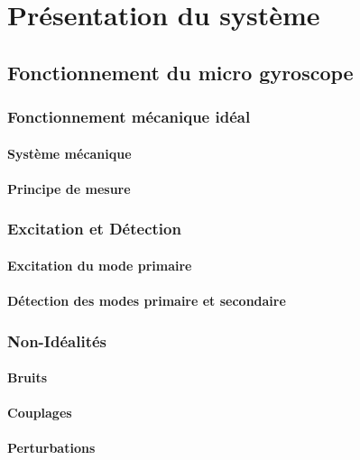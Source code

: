 \cleardoublepage{}
\chapter{Présentation du système}

\section{Fonctionnement du micro gyroscope}

\subsection{Fonctionnement mécanique idéal}
\subsubsection{Système mécanique}
\subsubsection{Principe de mesure}

\subsection{Excitation et Détection}
\subsubsection{Excitation du mode primaire}
\subsubsection{Détection des modes primaire et secondaire}

\subsection{Non-Idéalités}
\subsubsection{Bruits}
\subsubsection{Couplages}
\subsubsection{Perturbations}

